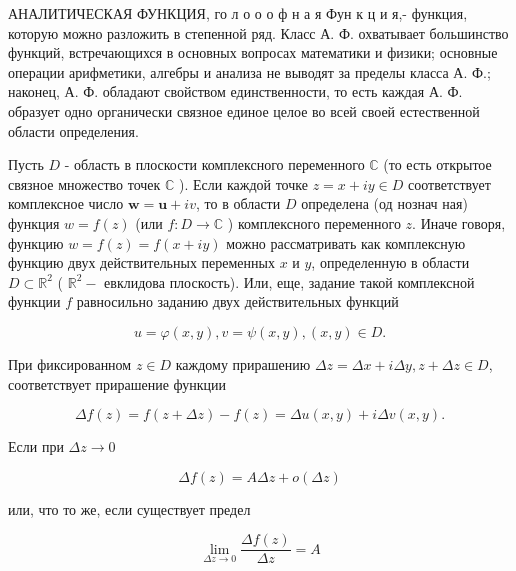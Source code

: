 \documentclass[10pt]{article}
\begin{document}
АНАЛИТИЧЕСКАЯ ФУНКЦИЯ, го л о о о ф н а я Фун к ц и я,- функция, которую можно разложить в степенной ряд. Класс А. Ф. охватывает большинство функций, встречающихся в основных вопросах математики и физики; основные операции арифметики, алгебры и анализа не выводят за пределы класса А. Ф.; наконец, А. Ф. обладают свойством единственности, то есть каждая А. Ф. образует одно органически связное единое целое во всей своей естественной области определения.



Пусть $D$ - область в плоскости комплексного переменного $\mathbb{C}$ (то есть открытое связное множество точек $\mathbb{C}$ ). Если каждой точке $z=x+i y \in D$ соответствует комплексное число $\boldsymbol{w}=\boldsymbol{u}+i v$, то в области $D$ определена (од нознач ная) функция $w=f(z)$ (или $f: D \rightarrow \mathbb{C}$ ) комплексного переменного $z$. Иначе говоря, функцию $w=f(z)=f(x+i y)$ можно рассматривать как комплексную функцию двух действительных переменных $x$ и $y$, определенную в области $D \subset \mathbb{R}^{2}$ ( $\mathbb{R}^{2}-$ евклидова плоскость). Или, еще, задание такой комплексной функции $f$ равносильно заданию двух действительных функций



\[

u=\varphi(x, y), v=\psi(x, y),(x, y) \in D .

\]



При фиксированном $z \in D$ каждому прирашению $\Delta z=\Delta x+i \Delta y, z+\Delta z \in D$, соответствует прирашение функции



\[

\Delta f(z)=f(z+\Delta z)-f(z)=\Delta u(x, y)+i \Delta v(x, y) .

\]



Если при $\Delta z \rightarrow 0$



\[

\Delta f(z)=A \Delta z+o(\Delta z)

\]



или, что то же, если существует предел



\[

\lim _{\Delta z \rightarrow 0} \frac{\Delta f(z)}{\Delta z}=A

\]
\end{document}
